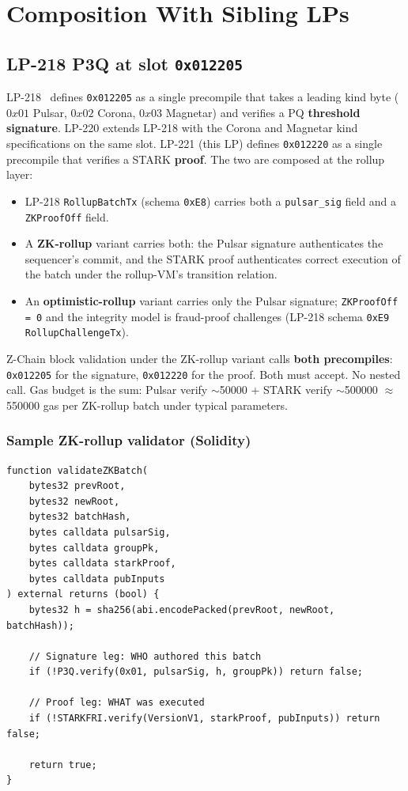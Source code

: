 \section{Composition With Sibling LPs}
\label{sec:composition}

\subsection{LP-218 P3Q at slot \texttt{0x012205}}

LP-218~\cite{lp218} defines \texttt{0x012205} as a single precompile
that takes a leading kind byte ($0x01$ Pulsar, $0x02$ Corona, $0x03$
Magnetar) and verifies a PQ \textbf{threshold signature}. LP-220
\cite{lp220} extends LP-218 with the Corona and Magnetar kind
specifications on the same slot. LP-221 (this LP) defines
\texttt{0x012220} as a single precompile that verifies a STARK
\textbf{proof}. The two are composed at the rollup layer:

\begin{itemize}[leftmargin=2em,nosep]
\item LP-218 \texttt{RollupBatchTx} (schema \texttt{0xE8}) carries
  both a \texttt{pulsar\_sig} field and a \texttt{ZKProofOff}
  field.
\item A \textbf{ZK-rollup} variant carries both: the Pulsar
  signature authenticates the sequencer's commit, and the STARK
  proof authenticates correct execution of the batch under the
  rollup-VM's transition relation.
\item An \textbf{optimistic-rollup} variant carries only the
  Pulsar signature; \texttt{ZKProofOff = 0} and the integrity
  model is fraud-proof challenges (LP-218 schema \texttt{0xE9}
  \texttt{RollupChallengeTx}).
\end{itemize}

Z-Chain block validation under the ZK-rollup variant calls
\textbf{both precompiles}: \texttt{0x012205} for the signature,
\texttt{0x012220} for the proof. Both must accept. No nested call.
Gas budget is the sum: Pulsar verify $\sim$\num{50000} $+$ STARK
verify $\sim$\num{500000} $\approx$ \num{550000} gas per
ZK-rollup batch under typical parameters.

\subsubsection{Sample ZK-rollup validator (Solidity)}

\begin{lstlisting}[language={}]
function validateZKBatch(
    bytes32 prevRoot,
    bytes32 newRoot,
    bytes32 batchHash,
    bytes calldata pulsarSig,
    bytes calldata groupPk,
    bytes calldata starkProof,
    bytes calldata pubInputs
) external returns (bool) {
    bytes32 h = sha256(abi.encodePacked(prevRoot, newRoot, batchHash));

    // Signature leg: WHO authored this batch
    if (!P3Q.verify(0x01, pulsarSig, h, groupPk)) return false;

    // Proof leg: WHAT was executed
    if (!STARKFRI.verify(VersionV1, starkProof, pubInputs)) return false;

    return true;
}
\end{lstlisting}

